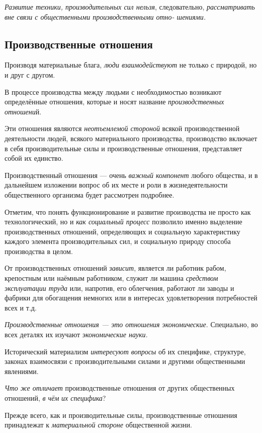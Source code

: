 \documentclass[a4paper,14pt,russian]{extreport}
\begin{document}
\emph{Развитие техники, производительных сил нельзя}, следовательно, \emph{рассматривать вне связи с общественными производственными отно- шениями.}

\subsection{Производственные отношения}

Производя материальные блага, \emph{люди взаимодействуют} не только с природой, но и друг с другом.

В процессе производства между людьми с необходимостью возникают определённые отношения, которые и носят название \emph{производственных отношени}й.

Эти отношения являются \emph{неотъемлемой стороной} всякой производственной деятельности людей, всякого материального производства, производство включает в себя производительные силы и производственные отношения, представляет собой их единство.

Производственный отношения --- очень \emph{важный компонент} любого общества, и в дальнейшем изложении вопрос об их месте и роли в жизнедеятельности общественного организма будет рассмотрен подробнее.

Отметим, что понять функционирование и развитие производства не просто как технологический, но и \emph{как социальный процесс} позволило именно выделение производственных отношений, определяющих и социальную характеристику каждого элемента производительных сил, и социальную природу способа производства в целом.

От производственных отношений \emph{зависит}, является ли работник рабом, крепостным или наёмным работником, служит ли машина \emph{средством эксплуатации труда} или, напротив, его облегчения, работают ли заводы и фабрики для обогащения немногих или в интересах удовлетворения потребностей всех и т.д.

\emph{Производственные отношения --- это отношения экономические}. Специально, во всех деталях их изучают \emph{экономические науки}.

Исторический материализм \emph{интересуют вопросы} об их специфике, структуре, законах взаимосвязи с производительными силами и другими общественными явлениями.

\emph{Что же отличает} производственные отношения от других общественных отношений, \emph{в чём} \emph{их специфика}?

Прежде всего, как и производительные силы, производственные отношения принадлежат к \emph{материальной стороне} общественной жизни.
\end{document}
